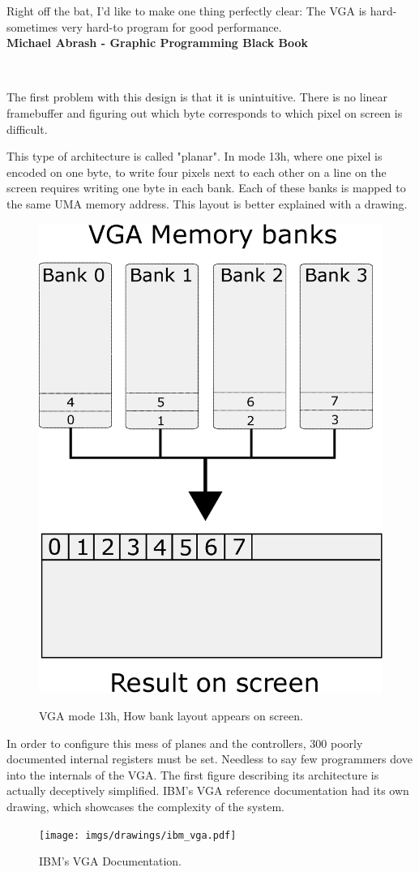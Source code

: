 \documentclass[book.tex]{subfiles}
\begin{document}
 \begin{fancyquotes}
   Right off the bat, I'd like to make one thing perfectly clear: The VGA is hard-sometimes very hard-to program for good performance.
 \bigskip \\
\textbf{Michael Abrash - Graphic Programming Black Book}
 \end{fancyquotes}
 \\
\par
The first problem with this design is that it is unintuitive. There is no linear framebuffer and figuring out which byte corresponds to which pixel on screen is difficult.\\
\par
 This type of architecture is called "planar". In mode 13h, where one pixel is encoded on one byte, to write four pixels next to each other on a line on the screen requires writing one byte in each bank. Each of these banks is mapped to the same UMA memory address. This layout is better explained with a drawing.\\
\par
\begin{figure}[H]
\centering
\includegraphics[width=.6\textwidth]{imgs/drawings/vga_ram_screen_layout.eps}
\label{fig:vga_arch}
\caption{VGA mode 13h, How bank layout appears on screen.}
\end{figure}

 

\par
In order to configure this mess of planes and the controllers, 300 poorly documented internal registers must be set. Needless to say few programmers dove into the internals of the VGA. The first figure describing its architecture is actually deceptively simplified. IBM's VGA reference documentation had its own drawing, which showcases the complexity of the system.\\
 \begin{figure}[H]
\centering
\texttt{[image: imgs/drawings/ibm\_vga.pdf]}
\caption{IBM's VGA Documentation.}
\label{fig:ibm_vga}
\end{figure}
\end{document}
